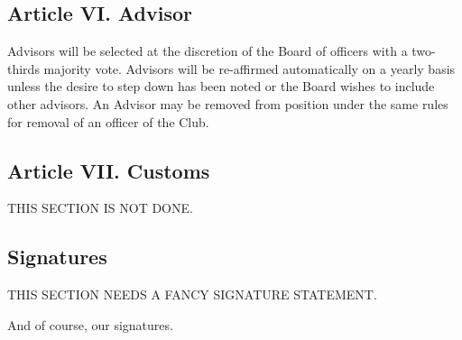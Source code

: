 \documentclass{article}
\begin{document}
  \subsection{Article VI. Advisor}
    Advisors will be selected at the discretion of the Board of officers with a two-thirds majority vote. Advisors will be re-affirmed automatically on a yearly basis unless the desire to step down has been noted or the Board wishes to include other advisors. An Advisor may be removed from position under the same rules for removal of an officer of the Club.

  \subsection{Article VII. Customs}
    THIS SECTION IS NOT DONE.

  \subsection{Signatures}
    THIS SECTION NEEDS A FANCY SIGNATURE STATEMENT.

    And of course, our signatures.
\end{document}
